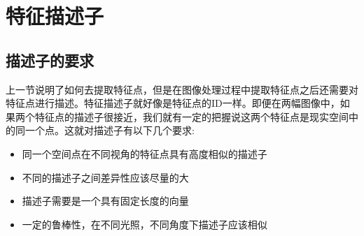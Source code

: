 \section{特征描述子}
\subsection{描述子的要求}
上一节说明了如何去提取特征点，但是在图像处理过程中提取特征点之后还需要对特征点进行描述。特征描述子就好像是特征点的ID一样。即便在两幅图像中，如果两个特征点的描述子很接近，我们就有一定的把握说这两个特征点是现实空间中的同一个点。这就对描述子有以下几个要求:
\begin{itemize}
	\item 同一个空间点在不同视角的特征点具有高度相似的描述子
	\item 不同的描述子之间差异性应该尽量的大
	\item 描述子需要是一个具有固定长度的向量
	\item 一定的鲁棒性，在不同光照，不同角度下描述子应该相似
\end{itemize}
















